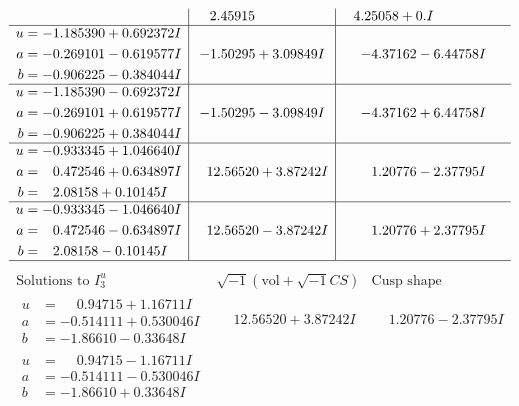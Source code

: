 \documentclass[1p]{elsarticle_modified}
\theoremstyle{definition}
\newcommand{\I}{\sqrt{-1}}
\begin{document}
$$\begin{array}{c|c|c}
 & \phantom{-}2.45915\phantom{ +0.000000I} & \phantom{-}4.25058 + 0. I\phantom{ +0.000000I} \\ \hline\begin{aligned}
u &= -1.185390 + 0.692372 I \\
a &= -0.269101 - 0.619577 I \\
b &= -0.906225 - 0.384044 I\end{aligned}
 & -1.50295 + 3.09849 I & -4.37162 - 6.44758 I \\ \hline\begin{aligned}
u &= -1.185390 - 0.692372 I \\
a &= -0.269101 + 0.619577 I \\
b &= -0.906225 + 0.384044 I\end{aligned}
 & -1.50295 - 3.09849 I & -4.37162 + 6.44758 I \\ \hline\begin{aligned}
u &= -0.933345 + 1.046640 I \\
a &= \phantom{-}0.472546 + 0.634897 I \\
b &= \phantom{-}2.08158 + 0.10145 I\end{aligned}
 & \phantom{-}12.56520 + 3.87242 I & \phantom{-}1.20776 - 2.37795 I \\ \hline\begin{aligned}
u &= -0.933345 - 1.046640 I \\
a &= \phantom{-}0.472546 - 0.634897 I \\
b &= \phantom{-}2.08158 - 0.10145 I\end{aligned}
 & \phantom{-}12.56520 - 3.87242 I & \phantom{-}1.20776 + 2.37795 I\\
 \hline 
 \end{array}$$\newpage$$\begin{array}{c|c|c}  
\text{Solutions to }I^u_{3}& \I (\text{vol} + \sqrt{-1}CS) & \text{Cusp shape}\\
 \hline 
\begin{aligned}
u &= \phantom{-}0.94715 + 1.16711 I \\
a &= -0.514111 + 0.530046 I \\
b &= -1.86610 - 0.33648 I\end{aligned}
 & \phantom{-}12.56520 + 3.87242 I & \phantom{-}1.20776 - 2.37795 I \\ \hline\begin{aligned}
u &= \phantom{-}0.94715 - 1.16711 I \\
a &= -0.514111 - 0.530046 I \\
b &= -1.86610 + 0.33648 I\end{aligned}

\end{array}$$
\end{document}
